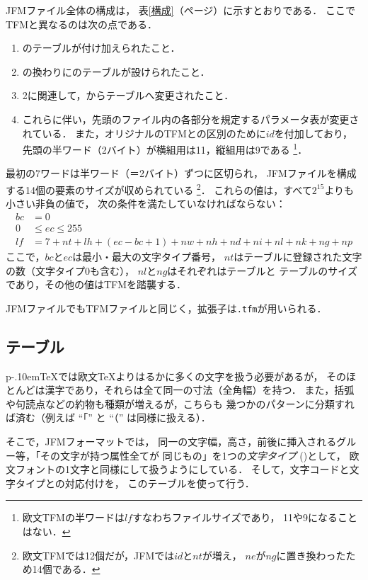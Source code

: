 \documentclass[a4paper,11pt,nomag]{jsarticle}
\def\size#1{\mathit{#1}}
\def\code#1{\texttt{#1}}
\def\pTeX{p\kern-.10em\TeX}\def\upTeX{u\pTeX}
\begin{document}
JFMファイル全体の構成は，
表\ref{構成}（\pageref{構成}ページ）に示すとおりである．
ここでTFMと異なるのは次の点である．
\begin{enumerate}
\item {}のテーブルが付け加えられたこと．
\item {}の換わりにのテーブルが設けられたこと．
\item 2に関連して，からテーブルへ変更されたこと．
\item これらに伴い，先頭のファイル内の各部分を規定するパラメータ表が変更されている．
  また，オリジナルのTFMとの区別のために$\size{id}$を付加しており，
  先頭の半ワード（2バイト）が横組用は11，縦組用は9である
  \footnote{欧文TFMの半ワードは$\size{lf}$すなわちファイルサイズであり，
  11や9になることはない．}．
\end{enumerate}
最初の7ワードは半ワード（＝2バイト）ずつに区切られ，
JFMファイルを構成する14個の要素のサイズが収められている
\footnote{欧文TFMでは12個だが，JFMでは$\size{id}$と$\size{nt}$が増え，
$\size{ne}$が$\size{ng}$に置き換わったため14個である．}．
これらの値は，すべて$2^{15}$よりも小さい非負の値で，
次の条件を満たしていなければならない：
\begin{align*}
\size{bc} &= 0 \\
0 &\leq \size{ec} \leq 255 \\
\size{lf} &= 7+\size{nt}+\size{lh}+(\size{ec}-\size{bc}+1)+\size{nw}+\size{nh}
               +\size{nd}+\size{ni}+\size{nl}+\size{nk}+\size{ng}+\size{np}
\end{align*}
ここで，$\size{bc}$と$\size{ec}$は最小・最大の文字タイプ番号，
$\size{nt}$はテーブルに登録された文字の数（文字タイプ0も含む），
$\size{nl}$と$\size{ng}$はそれぞれはテーブルと
テーブルのサイズであり，その他の値はTFMを踏襲する．

JFMファイルでもTFMファイルと同じく，拡張子は\code{.tfm}が用いられる．

\subsection{テーブル}
\pTeX では欧文\TeX よりはるかに多くの文字を扱う必要があるが，
そのほとんどは漢字であり，それらは全て同一の寸法（全角幅）を持つ．
また，括弧や句読点などの約物も種類が増えるが，こちらも
幾つかのパターンに分類すれば済む（例えば ``「'' と ``（'' は同様に扱える）．

そこで，JFMフォーマットでは，
同一の文字幅，高さ，前後に挿入されるグルー等，「その文字が持つ属性全てが
同じもの」を1つの\emph{文字タイプ} ()として，
欧文フォントの1文字と同様にして扱うようにしている．
そして，文字コードと文字タイプとの対応付けを，
このテーブルを使って行う．
\end{document}
